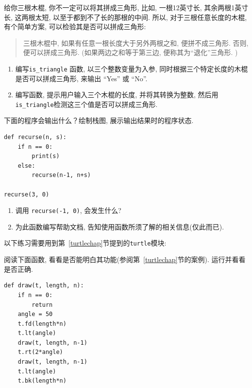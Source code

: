 \documentclass[10pt]{book}
\begin{document}
\begin{exercise}

给你三根木棍, 你不一定可以将其拼成三角形, 比如, 一根12英寸长, 
其余两根1英寸长, 这两根太短, 以至于都到不了长的那根的中间. 
所以, 对于三根任意长度的木棍, 有个简单方案, 可以检验其是否可以拼成三角形:

\begin{quotation}
三根木棍中, 如果有任意一根长度大于另外两根之和, 便拼不成三角形. 
否则, 便可以拼成三角形. (如果两边之和等于第三边, 便称其为``退化''三角形. )
\end{quotation}

\begin{enumerate}

\item 编写\verb"is_triangle" 函数, 以三个整数变量为入参, 
同时根据三个特定长度的木棍是否可以拼成三角形, 来输出 ``Yes'' 或 ``No''. 

\item 编写函数, 提示用户输入三个木棍的长度, 并将其转换为整数, 
然后用\verb"is_triangle"检测这三个值是否可以拼成三角形. 
\end{enumerate}

\end{exercise}

\begin{exercise}
下面的程序会输出什么？绘制栈图, 展示输出结果时的程序状态.

\begin{verbatim}
def recurse(n, s):
    if n == 0:
        print(s)
    else:
        recurse(n-1, n+s)

recurse(3, 0)
\end{verbatim}

\begin{enumerate}

\item 调用 {\tt  recurse(-1, 0)}, 会发生什么?

\item 为此函数编写帮助文档, 告知使用函数所须了解的相关信息(仅此而已).

\end{enumerate}

\end{exercise}

以下练习需要用到第~\ref{turtlechap}节提到的{\tt turtle}模块:

\begin{exercise}
阅读下面函数, 看看是否能明白其功能(参阅第~\ref{turtlechap}节的案例). 
运行并看看是否正确. 

\begin{verbatim}
def draw(t, length, n):
    if n == 0:
        return
    angle = 50
    t.fd(length*n)
    t.lt(angle)
    draw(t, length, n-1)
    t.rt(2*angle)
    draw(t, length, n-1)
    t.lt(angle)
    t.bk(length*n)
\end{verbatim}

\end{exercise}
\end{document}

